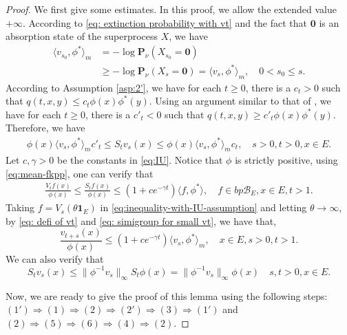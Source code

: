\documentclass[UTF8]{pkuthss}
\theoremstyle{plain}
\theoremstyle{definition}
\numberwithin{equation}{section}
\begin{document}
\begin{proof}
We first give some estimates. In this proof, we allow the extended value $+\infty$.
	According to \eqref{eq: extinction probability with vt} and the fact that $\mathbf 0$ is an absorption state of the superprocess $X$, we have
\begin{align}\label{eq:assertion1}
	\langle v_{s_0},\phi^* \rangle_m
	&= -\log \mathbf P_\nu ( X_{s_0} = \mathbf 0 )\\
	& \geq -\log \mathbf P_\nu ( X_s = \mathbf 0 )
	= \langle v_s,\phi^* \rangle_m,
	\quad 0 < s_0\leq s.
\end{align}
	According to Assumption \ref{asp:2'}, we have for each $t\geq 0$, there is a $c_t>0$ such that $q(t,x,y)\leq c_t \phi(x)\phi^*(y)$. 
 Using an argument similar to that of \cite[Proposition 2.5]{KimSong2008Intrinsic}, 
	we have for each $t\geq 0$, there is a $c'_t < 0$ such that $q(t,x,y) \geq c'_t \phi(x)\phi^*(y)$.
	Therefore, we have
\begin{align}\label{eq:assertion2}
	\phi(x) \langle v_s , \phi^* \rangle_m c'_t
\leq S_t v_s(x) \leq \phi(x) \langle v_s , \phi^* \rangle_m c_t,
	\quad s>0,t>0,x\in E.
\end{align}
	Let $c,\gamma > 0$ be the constants in \eqref{eq:IU}. 
	Notice that $\phi$ is strictly positive, using \eqref{eq:mean-fkpp}, one can verify that
\begin{align}\label{eq:inequality-with-IU-assumption}
	\frac{V_t f(x)}{\phi(x)}
	\leq \frac{S_t f(x)}{\phi(x)}
	\leq (1+ ce^{-\gamma t}) \langle f,\phi^*\rangle,
	\quad f\in bp\mathscr B_E,x\in E,t>1.
\end{align}
	Taking $f = V_s(\theta \mathbf 1_E)$ in \eqref{eq:inequality-with-IU-assumption} and letting $\theta \to \infty$,
	by \eqref{eq: defi of vt} and \eqref{eq: simigroup for small vt},
	we have that,
\begin{equation}\label{eq:assertion3}
	\frac{v_{t+s}(x)}{\phi(x)}
	\leq (1+ ce^{-\gamma t}) \langle v_s,\phi^*\rangle_m,
	\quad x\in E,s>0,t>1.
\end{equation}
	We can also verify that
\begin{equation}\label{eq:assertion4}
	S_t v_s(x)
	\leq \|\phi^{-1}v_s\|_\infty  S_t \phi(x)
	= \|\phi^{-1}v_s\|_\infty \phi(x)
	\quad s,t>0,x\in E.
\end{equation}
\par
	Now, we are ready to give the proof of this lemma using the following steps: 
	$(1')\Rightarrow (1)\Rightarrow (2)\Rightarrow (2')\Rightarrow (3)\Rightarrow (1')$
	and $(2)\Rightarrow (5)\Rightarrow (6)\Rightarrow (4)\Rightarrow (2)$.

\end{proof}
\end{document}
